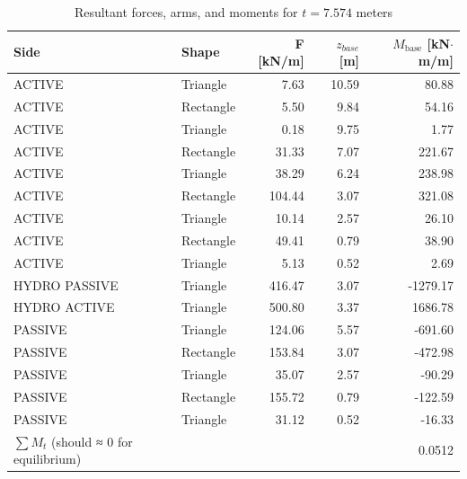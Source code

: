 \begin{table}[H]
  \centering
  \caption{Resultant forces, arms, and moments for $t = 7.574$ meters}
  \label{tab:forces_arms_moments_9713}
  \small
  \setlength{\tabcolsep}{8pt}
  \renewcommand{\arraystretch}{1.15}
  \begin{tabular}{@{}l l r r r@{}}
    \toprule
    Side & Shape &
    F [kN/m] & $z_{base}$ [m] &
    $M_{\text{base}}$ [kN$\cdot$m/m] \\
    \midrule
    ACTIVE  & Triangle  &   7.63  & 10.59 &  80.88 \\
    ACTIVE  & Rectangle &   5.50  &  9.84 &  54.16 \\
    ACTIVE  & Triangle  &   0.18  &  9.75 &   1.77 \\
    ACTIVE  & Rectangle &  31.33  &  7.07 & 221.67 \\
    ACTIVE  & Triangle  &  38.29  &  6.24 & 238.98 \\
    ACTIVE  & Rectangle & 104.44  &  3.07 & 321.08 \\
    ACTIVE  & Triangle  &  10.14  &  2.57 &  26.10 \\
    ACTIVE  & Rectangle &  49.41  &  0.79 &  38.90 \\
    ACTIVE  & Triangle  &   5.13  &  0.52 &   2.69 \\
    HYDRO PASSIVE   & Triangle  & 416.47  &  3.07 & -1279.17 \\
    HYDRO ACTIVE    & Triangle  & 500.80  &  3.37 & 1686.78 \\
    PASSIVE & Triangle  & 124.06  &  5.57 &  -691.60 \\
    PASSIVE & Rectangle & 153.84  &  3.07 &  -472.98 \\
    PASSIVE & Triangle  &  35.07  &  2.57 &   -90.29 \\
    PASSIVE & Rectangle & 155.72  &  0.79 &  -122.59 \\
    PASSIVE & Triangle  &  31.12  &  0.52 &   -16.33 \\
    \midrule
    $\sum M_{t}$ (should ≈ 0 for equilibrium) & & & & 0.0512 \\
    \bottomrule
  \end{tabular}
\end{table}



